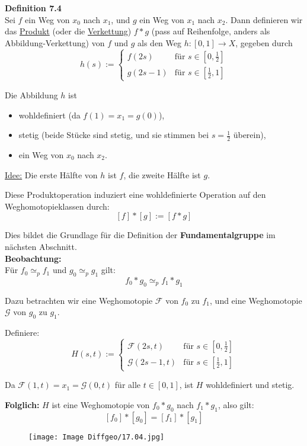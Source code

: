 \documentclass[fleqn, 12pt, letterpaper]{article}
\begin{document}
\textbf{Definition 7.4} \\
Sei \( f \) ein Weg von \( x_0 \) nach \( x_1 \), und \( g \) ein Weg von \( x_1 \) nach \( x_2 \). Dann definieren wir das \underline{Produkt} (oder die \underline{Verkettung}) \( f * g \) (pass auf Reihenfolge, anders als Abbildung-Verkettung) von \( f \) und \( g \) als den Weg \( h : [0,1] \to X \), gegeben durch
\[
h(s) := 
\begin{cases}
f(2s) & \text{für } s \in [0,\tfrac{1}{2}] \\
g(2s - 1) & \text{für } s \in [\tfrac{1}{2}, 1]
\end{cases}
\]

Die Abbildung \( h \) ist
\begin{itemize}
  \item wohldefiniert (da \( f(1) = x_1 = g(0) \)),
  \item stetig (beide Stücke sind stetig, und sie stimmen bei \( s = \tfrac{1}{2} \) überein),
  \item ein Weg von \( x_0 \) nach \( x_2 \).
\end{itemize}

\underline{Idee:} Die erste Hälfte von \( h \) ist \( f \), die zweite Hälfte ist \( g \).

Diese Produktoperation induziert eine wohldefinierte Operation auf den Weghomotopieklassen durch:
\[
[f] * [g] := [f * g]
\]

Dies bildet die Grundlage für die Definition der \textbf{Fundamentalgruppe} im nächsten Abschnitt.\\

\textbf{Beobachtung:} \\
Für \( f_0 \simeq_p f_1 \) und \( g_0 \simeq_p g_1 \) gilt:
\[
f_0 * g_0 \simeq_p f_1 * g_1
\]

Dazu betrachten wir eine Weghomotopie \( \mathcal{F} \) von \( f_0 \) zu \( f_1 \), und eine Weghomotopie \( \mathcal{G} \) von \( g_0 \) zu \( g_1 \).

Definiere:
\[
H(s,t) :=
\begin{cases}
\mathcal{F}(2s,t) & \text{für } s \in [0, \tfrac{1}{2}] \\
\mathcal{G}(2s - 1, t) & \text{für } s \in [\tfrac{1}{2}, 1]
\end{cases}
\]

Da \( \mathcal{F}(1,t) = x_1 = \mathcal{G}(0,t) \) für alle \( t \in [0,1] \), ist \( H \) wohldefiniert und stetig.

\textbf{Folglich:} \( H \) ist eine Weghomotopie von \( f_0 * g_0 \) nach \( f_1 * g_1 \), also gilt:
\[
[f_0] * [g_0] = [f_1] * [g_1]
\]
  \begin{figure}[H]
    \centering
    \texttt{[image: Image Diffgeo/17.04.jpg]}
 \end{figure}
\end{document}
